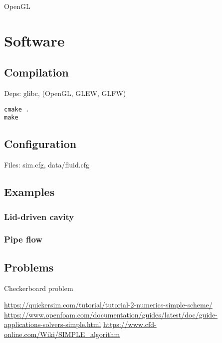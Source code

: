 \documentclass[12pt]{article}
\begin{document}
OpenGL

\section{Software}

\subsection{Compilation}

Deps: glibc, (OpenGL, GLEW, GLFW)

\begin{verbatim}
cmake .
make
\end{verbatim}

\subsection{Configuration}

Files: sim.cfg, data/fluid.cfg

\subsection{Examples}

\subsubsection{Lid-driven cavity}

\subsubsection{Pipe flow}

\subsection{Problems}

Checkerboard problem

\begin{comment}
  Virtausdynamiikkasimulaattorin toteuttaminen ja soveltaminen nesteiden virtausprofiilien laskemiseen putkissa
\end{comment}

\begin{thebibliography}{9}

 \url{https://quickersim.com/tutorial/tutorial-2-numerics-simple-scheme/}
 \url{https://www.openfoam.com/documentation/guides/latest/doc/guide-applications-solvers-simple.html}
   \url{https://www.cfd-online.com/Wiki/SIMPLE_algorithm}

\end{thebibliography}
\end{document}
